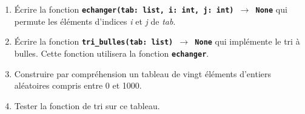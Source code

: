 \documentclass[a4paper,11pt]{article}
\begin{document}
\begin{exo}
\begin{enumerate}
    \item Écrire la fonction \textbf{\texttt{echanger(tab: list, i: int, j: int) $\rightarrow$ None}} qui permute les éléments d'indices \emph{i} et \emph{j} de \emph{tab}.
    \item Écrire la fonction \textbf{\texttt{tri\_bulles(tab: list) $\rightarrow$ None}} qui implémente le tri à bulles. Cette fonction utilisera la fonction \textbf{\texttt{echanger}}.
    \item Construire par compréhension un tableau de vingt éléments d'entiers aléatoires compris entre 0 et 1000.
    \item Tester la fonction de tri sur ce tableau.
\end{enumerate}
\end{exo}
\end{document}
